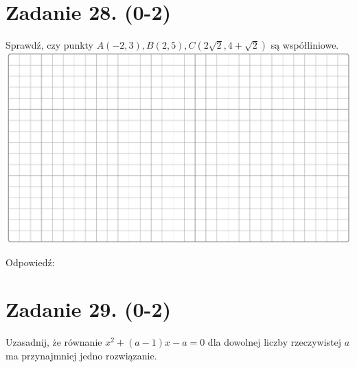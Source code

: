 \documentclass[10pt]{article}
\begin{document}
\section*{Zadanie 28. (0-2)}
Sprawdź, czy punkty \(A(-2,3), B(2,5), C(2 \sqrt{2}, 4+\sqrt{2})\) są współliniowe.\\
\includegraphics[max width=\textwidth, center]{2024_11_21_e15da647cf0a41077ac3g-11}

Odpowiedź: \(\qquad\)

\section*{Zadanie 29. (0-2)}
Uzasadnij, że równanie \(x^{2}+(a-1) x-a=0\) dla dowolnej liczby rzeczywistej \(a\) ma przynajmniej jedno rozwiązanie.
\end{document}
